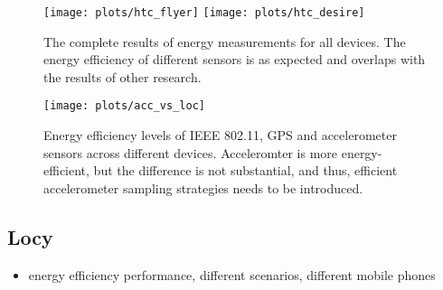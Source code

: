 \documentclass[a2,landscape]{a0poster}
\begin{document}
  \begin{figure}[H]
\centering
\texttt{[image: plots/htc\_flyer]}
\texttt{[image: plots/htc\_desire]}
\caption{\label{p:all_results} The complete results of energy measurements for all devices. The energy efficiency of different sensors is as expected and overlaps with the results of other research. }
\end{figure}

\begin{figure}[H]
\texttt{[image: plots/acc\_vs\_loc]}
\caption{\label{p:all_results} Energy efficiency levels of IEEE 802.11, GPS and accelerometer sensors across different devices. Acceleromter is more energy-efficient, but the difference is not substantial, and thus, efficient accelerometer sampling strategies needs to be introduced. }
\end{figure}

\subsection*{Locy}
\begin{itemize}
   \item energy efficiency performance, different scenarios, different mobile phones
  \end{itemize}
\mbox{}
\end{document}

